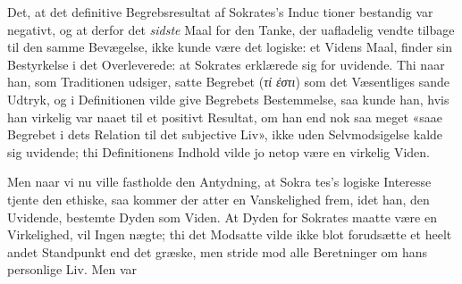 \documentclass[12pt,a4paper]{book}
\newcommand{\gk}[1]{\textit{#1}}
\begin{document}
Det, at det definitive Begrebsresultat af Sokrates's Induc\-%
tioner bestandig var negativt, og at derfor det \emph{sidste} Maal
for den Tanke, der uafladelig vendte tilbage til den samme
Bevægelse, ikke kunde være det logiske: et Videns Maal, finder
sin Bestyrkelse i det Overleverede: at Sokrates erklærede sig
for uvidende. Thi naar han, som Traditionen udsiger,
satte Begrebet (\gk{τί ἐστι}) som det Væsentliges sande Udtryk, og
i Definitionen vilde give Begrebets Bestemmelse, saa kunde
han, hvis han virkelig var naaet til et positivt Resultat, om
han end nok saa meget «saae Begrebet i dets Relation til det
subjective Liv», ikke uden Selvmodsigelse kalde sig uvidende;
thi Definitionens Indhold vilde jo netop være en virkelig
Viden.

Men naar vi nu ville fastholde den Antydning, at Sokra\-%
tes's logiske Interesse tjente den ethiske, saa kommer der
atter en Vanskelighed frem, idet han, den Uvidende, bestemte
Dyden som Viden. At Dyden for Sokrates maatte være en
Virkelighed, vil Ingen nægte; thi det Modsatte vilde ikke blot
forudsætte et heelt andet Standpunkt end det græske, men
stride mod alle Beretninger om hans personlige Liv. Men var
\end{document}
